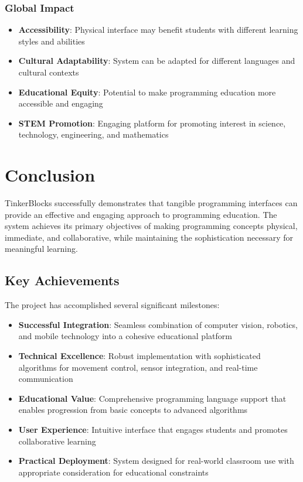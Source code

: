 \subsubsection{Global Impact}
\begin{itemize}
    \item \textbf{Accessibility}: Physical interface may benefit students with different learning styles and abilities
    \item \textbf{Cultural Adaptability}: System can be adapted for different languages and cultural contexts
    \item \textbf{Educational Equity}: Potential to make programming education more accessible and engaging
    \item \textbf{STEM Promotion}: Engaging platform for promoting interest in science, technology, engineering, and mathematics
\end{itemize}

\section{Conclusion}

TinkerBlocks successfully demonstrates that tangible programming interfaces can provide an effective and engaging approach to programming education. The system achieves its primary objectives of making programming concepts physical, immediate, and collaborative, while maintaining the sophistication necessary for meaningful learning.

\subsection{Key Achievements}

The project has accomplished several significant milestones:

\begin{itemize}
    \item \textbf{Successful Integration}: Seamless combination of computer vision, robotics, and mobile technology into a cohesive educational platform
    \item \textbf{Technical Excellence}: Robust implementation with sophisticated algorithms for movement control, sensor integration, and real-time communication
    \item \textbf{Educational Value}: Comprehensive programming language support that enables progression from basic concepts to advanced algorithms
    \item \textbf{User Experience}: Intuitive interface that engages students and promotes collaborative learning
    \item \textbf{Practical Deployment}: System designed for real-world classroom use with appropriate consideration for educational constraints
\end{itemize}

